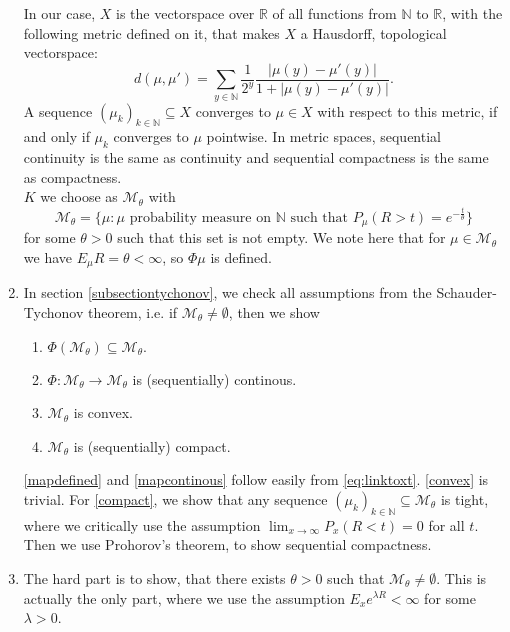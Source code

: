 \documentclass[12pt,a4paper]{scrartcl}
\numberwithin{equation}{section}
\newcommand{\R}{\mathbb{R}} %
\newcommand{\N}{\mathbb{N}} %
\begin{document}
\begin{enumerate}
In our case, $X$ is the vectorspace over $\R$ of all functions from $\N$ to $\R$, with the following metric defined on it, that makes $X$ a Hausdorff, topological vectorspace:
\begin{equation}
d\left(\mu, \mu'\right) = \sum_{y \in \N} \frac{1}{2^y} \frac{ \left|\mu\left(y\right) - \mu'\left(y\right) \right|}{1+\left|\mu\left(y\right) - \mu'\left(y\right) \right|}.
\end{equation}
A sequence $\left(\mu_k\right)_{k \in \N} \subseteq X$ converges to $\mu \in X$ with respect to this metric, if and only if $ \mu_k$ converges to $\mu$ pointwise. In metric spaces, sequential continuity is the same as continuity and sequential compactness is the same as compactness.\\[2ex]
$K$ we choose as $\mathcal{M}_{\theta}$ with
\begin{equation} \label{eq:mtheta}
\mathcal{M}_{\theta} = \lbrace  \mu : \mu \text{ probability measure on } \N \text{ such that } P_{\mu}\left(R>t\right) = e^{-\frac{t}{\theta}}\rbrace
\end{equation}
for some $\theta > 0$ such that this set is not empty. We note here that for $\mu \in \mathcal{M}_{\theta}$ we have $E_{\mu} R = \theta < \infty$, so $\Phi\mu$ is defined.
\item In section \ref{subsectiontychonov}, we check all assumptions from the Schauder-Tychonov theorem, i.e. if $\mathcal{M}_{\theta} \neq \emptyset$, then we show
\begin{enumerate}
\item \label{mapdefined} $\Phi\left(\mathcal{M}_{\theta}\right) \subseteq \mathcal{M}_{\theta}.$ \label{mapdefined}
\item \label{mapcontinous} $\Phi: \mathcal{M}_{\theta} \to \mathcal{M}_{\theta}$ is (sequentially) continous. \label{mapcontinous}
\item \label{convex} $\mathcal{M}_{\theta}$ is convex. \label{convex}
\item \label{compact} $\mathcal{M}_{\theta}$ is (sequentially) compact. \label{compact}
\end{enumerate}
\eqref{mapdefined} and \eqref{mapcontinous} follow easily from \eqref{eq:linktoxt}. \eqref{convex} is trivial. For \eqref{compact}, we show that any sequence $\left(\mu_k\right)_{k \in \N} \subseteq \mathcal{M}_{\theta} $ is tight, where we critically use the assumption $\lim_{x \to \infty} P_x\left(R < t\right) = 0$ for all $t.$ Then we use Prohorov's theorem, to show sequential compactness.
\item The hard part is to show, that there exists $\theta > 0$ such that $\mathcal{M}_{\theta} \neq \emptyset.$ This is actually the only part, where we use the assumption $E_x e^{\lambda R} < \infty$ for some $\lambda > 0$. \\[1ex]

\end{enumerate}
\end{document}
